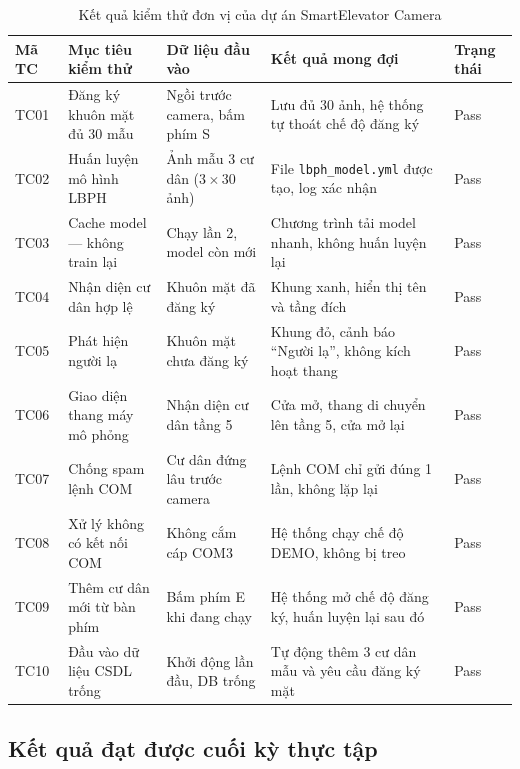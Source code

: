 \documentclass[12pt,a4paper]{article}
\begin{document}
\begin{table}[h!]
\centering
\caption{Kết quả kiểm thử đơn vị của dự án SmartElevator Camera}
\renewcommand{\arraystretch}{1.3}
\begin{tabular}{|m{1.5cm}|m{4.5cm}|m{4.5cm}|m{2.5cm}|m{1.5cm}|}
\hline
\textbf{Mã TC} & \textbf{Mục tiêu kiểm thử} & \textbf{Dữ liệu đầu vào} & \textbf{Kết quả mong đợi} & \textbf{Trạng thái} \\ \hline
TC01 & Đăng ký khuôn mặt đủ 30 mẫu & Ngồi trước camera, bấm phím S & Lưu đủ 30 ảnh, hệ thống tự thoát chế độ đăng ký & Pass \\ \hline
TC02 & Huấn luyện mô hình LBPH & Ảnh mẫu 3 cư dân ($3 \times 30$ ảnh) & File \texttt{lbph\_model.yml} được tạo, log xác nhận & Pass \\ \hline
TC03 & Cache model --- không train lại & Chạy lần 2, model còn mới & Chương trình tải model nhanh, không huấn luyện lại & Pass \\ \hline
TC04 & Nhận diện cư dân hợp lệ & Khuôn mặt đã đăng ký & Khung xanh, hiển thị tên và tầng đích & Pass \\ \hline
TC05 & Phát hiện người lạ & Khuôn mặt chưa đăng ký & Khung đỏ, cảnh báo ``Người lạ'', không kích hoạt thang & Pass \\ \hline
TC06 & Giao diện thang máy mô phỏng & Nhận diện cư dân tầng 5 & Cửa mở, thang di chuyển lên tầng 5, cửa mở lại & Pass \\ \hline
TC07 & Chống spam lệnh COM & Cư dân đứng lâu trước camera & Lệnh COM chỉ gửi đúng 1 lần, không lặp lại & Pass \\ \hline
TC08 & Xử lý không có kết nối COM & Không cắm cáp COM3 & Hệ thống chạy chế độ DEMO, không bị treo & Pass \\ \hline
TC09 & Thêm cư dân mới từ bàn phím & Bấm phím E khi đang chạy & Hệ thống mở chế độ đăng ký, huấn luyện lại sau đó & Pass \\ \hline
TC10 & Đầu vào dữ liệu CSDL trống & Khởi động lần đầu, DB trống & Tự động thêm 3 cư dân mẫu và yêu cầu đăng ký mặt & Pass \\ \hline
\end{tabular}
\end{table}

\subsection{Kết quả đạt được cuối kỳ thực tập}
\end{document}
